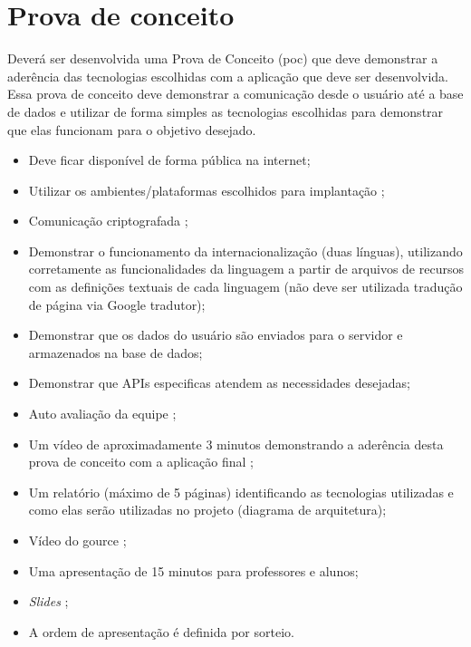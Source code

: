 \section{Prova de conceito}\label{atv-prova-de-conceito}
Deverá ser desenvolvida uma Prova de Conceito (\ac{poc}) que deve demonstrar a aderência das tecnologias escolhidas com a aplicação que deve ser desenvolvida. Essa prova de conceito deve demonstrar a comunicação desde o usuário até a base de dados e utilizar de forma simples as tecnologias escolhidas para demonstrar que elas funcionam para o objetivo desejado.

\begin{itemize}
    \item Deve ficar disponível de forma pública na internet;
    
    \item Utilizar os ambientes/plataformas escolhidos para implantação ;
    
    \item Comunicação criptografada ;
    
    \item Demonstrar o funcionamento da internacionalização (duas línguas), utilizando corretamente as funcionalidades da linguagem a partir de arquivos de recursos com as definições textuais de cada linguagem (não deve ser utilizada tradução de página via Google tradutor);
    
    \item Demonstrar que os dados do usuário são enviados para o servidor e armazenados na base de dados;
    
    \item Demonstrar que APIs especificas atendem as necessidades desejadas;
    
    \item Auto avaliação da equipe ;
    
    \item Um vídeo de aproximadamente 3 minutos demonstrando a aderência desta prova de conceito com a aplicação final ;
    
    \item Um relatório (máximo de 5 páginas) identificando as tecnologias utilizadas e como elas serão utilizadas no projeto (diagrama de arquitetura);
    
    \item Vídeo do \gls{gource} ;
    
    \item Uma apresentação de 15 minutos para professores e alunos;

    \item \emph{Slides} ;

    \item A ordem de apresentação é definida por sorteio.
    
    
\end{itemize}


